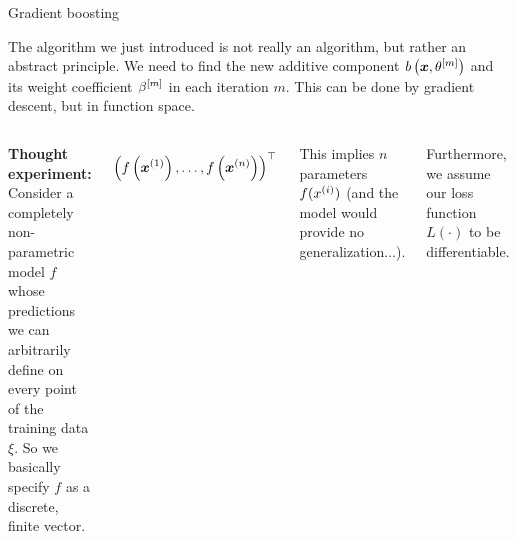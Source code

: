 
\begin{vbframe}{Gradient boosting}

\begin{footnotesize}
The algorithm we just introduced is not really an algorithm, but rather an abstract principle.
We need to find the new additive component $b\left(\bm{x}, \theta^{[m]}\right)$ and its
weight coefficient $\beta^{[m]}$ in each iteration $m$.
This can be done by gradient descent, but in function space.

\lz
\begin{columns}
\column{5cm}
\textbf{Thought experiment:}
Consider a completely non-parametric model $f$ whose predictions we can arbitrarily define on every point of the training data $\xi$. So we basically specify
$f$ as a discrete, finite vector.

  $$\left(f\left(\bm{x}^{(1)}\right), \ldots,  f\left(\bm{x}^{(n)}\right)\right)^\top $$

This implies $n$ parameters $f(x^{(i)})$ (and the model would provide no generalization...).

Furthermore, we assume our loss function $L(\cdot)$ to be differentiable.

\column{5cm}
\begin{center}
  \vspace{-1cm}
  \includegraphics[width=\textwidth]{figure/fig-gb-concept-2.png}
\end{center}

\end{columns}
\end{footnotesize}
\end{vbframe}

